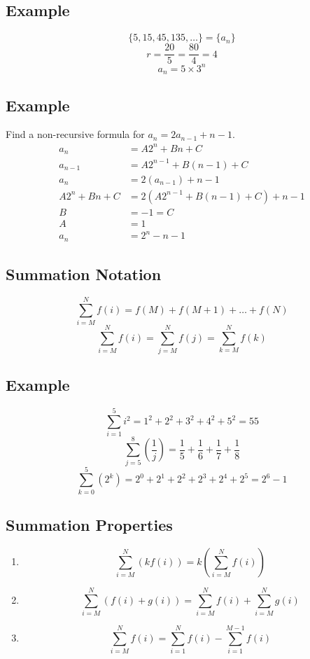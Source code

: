 \documentclass[letterpaper, 12pt]{math}
\begin{document}
\subsection*{Example}
\[ \{5,15,45,135,\dots\} = \{a_{n}\} \]
\[ r = \frac{20}{5} = \frac{80}{4} = 4 \]
\[ a_{n} = 5\times 3^{n} \]

\subsection*{Example}
Find a non-recursive formula for \( a_{n} = 2a_{n-1}+n-1 \).
\begin{align*}
  a_{n} &= A2^{n}+Bn+C \\
  a_{n-1} &= A2^{n-1}+B(n-1)+C \\
  a_{n} &= 2(a_{n-1})+n-1 \\
  A2^{n}+Bn+C &= 2(A2^{n-1}+B(n-1)+C)+n-1 \\
  B &= -1 = C \\
  A &= 1 \\
  a_{n} &= 2^{n}-n-1
\end{align*}

\subsection*{Summation Notation}
\[ \sum_{i=M}^{N}f(i) = f(M)+f(M+1)+\dots+f(N) \]
\[ \sum_{i=M}^{N}f(i) = \sum_{j=M}^{N}f(j) = \sum_{k=M}^{N}f(k) \]

\subsection*{Example}
\[ \sum_{i=1}^{5}i^{2} = 1^{2}+2^{2}+3^{2}+4^{2}+5^{2} = 55 \]
\[ \sum_{j=5}^{8}(\frac{1}{j}) = \frac{1}{5}+\frac{1}{6}+\frac{1}{7}+
   \frac{1}{8} \]
\[ \sum_{k=0}^{5}(2^{k}) = 2^{0}+2^{1}+2^{2}+2^{3}+2^{4}+2^{5} = 2^{6}-1 \]

\subsection*{Summation Properties}
\begin{enumerate}
  \item
    \[ \sum_{i=M}^{N}(kf(i)) = k(\sum_{i=M}^{N}f(i)) \]
  \item
    \[ \sum_{i=M}^{N}(f(i)+g(i)) = \sum_{i=M}^{N}f(i)+\sum_{i=M}^{N}g(i) \]
  \item
    \[ \sum_{i=M}^{N}f(i) = \sum_{i=1}^{N}f(i)-\sum_{i=1}^{M-1}f(i) \]
\end{enumerate}
\end{document}
